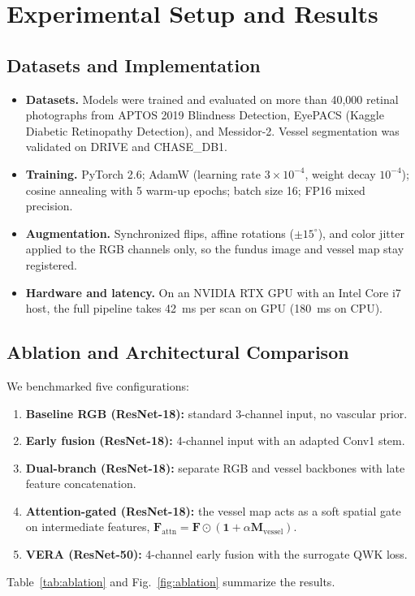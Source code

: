 \documentclass[conference]{IEEEtran}
\begin{document}
\section{Experimental Setup and Results}

\subsection{Datasets and Implementation}
\begin{itemize}
\item \textbf{Datasets.} Models were trained and evaluated on more than 40{,}000 retinal photographs from APTOS 2019 Blindness Detection, EyePACS (Kaggle Diabetic Retinopathy Detection), and Messidor-2. Vessel segmentation was validated on DRIVE and CHASE\_DB1.
\item \textbf{Training.} PyTorch 2.6; AdamW (learning rate $3{\times}10^{-4}$, weight decay $10^{-4}$); cosine annealing with 5 warm-up epochs; batch size 16; FP16 mixed precision.
\item \textbf{Augmentation.} Synchronized flips, affine rotations ($\pm15^\circ$), and color jitter applied to the RGB channels only, so the fundus image and vessel map stay registered.
\item \textbf{Hardware and latency.} On an NVIDIA RTX GPU with an Intel Core i7 host, the full pipeline takes 42~ms per scan on GPU (180~ms on CPU).
\end{itemize}

\subsection{Ablation and Architectural Comparison}
We benchmarked five configurations:
\begin{enumerate}
\item \textbf{Baseline RGB (ResNet-18):} standard 3-channel input, no vascular prior.
\item \textbf{Early fusion (ResNet-18):} 4-channel input with an adapted Conv1 stem.
\item \textbf{Dual-branch (ResNet-18):} separate RGB and vessel backbones with late feature concatenation.
\item \textbf{Attention-gated (ResNet-18):} the vessel map acts as a soft spatial gate on intermediate features, $\mathbf{F}_{\mathrm{attn}}=\mathbf{F}\odot(\mathbf{1}+\alpha\mathbf{M}_{\mathrm{vessel}})$.
\item \textbf{VERA (ResNet-50):} 4-channel early fusion with the surrogate QWK loss.
\end{enumerate}
\noindent Table~\ref{tab:ablation} and Fig.~\ref{fig:ablation} summarize the results.
\end{document}
